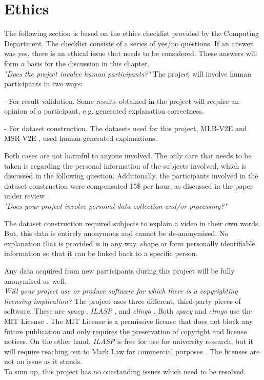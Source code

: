 \chapter{Ethics}

The following section is based on the ethics checklist provided by the Computing Department. 
The checklist consists of a series of yes/no questions. 
If an answer was yes, there is an ethical issue that needs to be considered.
These answers will form a basis for the discussion in this chapter. \\


\emph{"Does the project involve human participants?"}
The project will involve human participants in two ways: 

    - For result validation. Some results obtained in the project will require an opinion of a participant, e.g. generated explanation correctness.
    
    - For dataset construction. The datasets used for this project, MLB-V2E \cite{RefWorks:RefID:16-2021automatic} and MSR-V2E \cite{RefWorks:RefID:16-2021automatic}, used human-generated explanations.

Both cases are not harmful to anyone involved. The only care that needs to be taken is regarding the personal information of the subjects involved, which is discussed in the following question.
Additionally, the participants involved in the dataset construction were compensated 15\$ per hour, as discussed in the paper under review \cite{RefWorks:RefID:16-2021automatic}.\\

\emph{"Does your project involve personal data collection and/or processing?"}

The dataset construction required subjects to explain a video in their own words.
But, this data is entirely anonymous and cannot be de-anonymised.
No explanation that is provided is in any way, shape or form personally identifiable information so that it can be linked back to a specific person.

Any data acquired from new participants during this project will be fully anonymised as well. \\

\emph{Will your project use or produce software for which there is a copyrighting licensing implication?}
The project uses three different, third-party pieces of software.
These are \emph{spacy} \cite{RefWorks:RefID:24-spacy}, \emph{ILASP} \cite{RefWorks:RefID:18-law2020ilasp}, and \emph{clingo} \cite{RefWorks:RefID:22-clingo}.
Both \emph{spacy} and \emph{clingo} use the MIT License \cite{RefWorks:RefID:53-mit}.
The MIT License is a permissive license that does not block any future publication and only requires the preservation of copyright and license notices.
On the other hand, \emph{ILASP} is free for use for university research, but it will require reaching out to Mark Law for commercial purposes \cite{RefWorks:RefID:54-ilasp}.
The licenses are not an issue as it stands. \\


To sum up, this project has no outstanding issues which need to be resolved.
